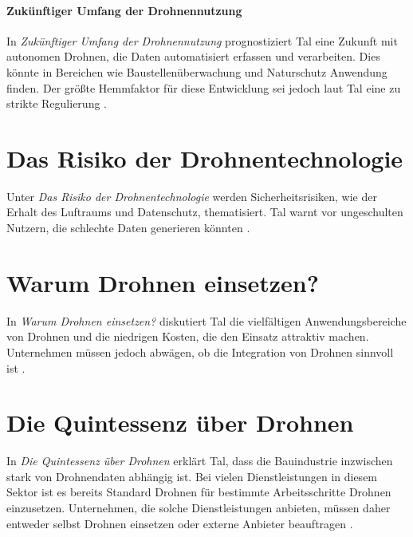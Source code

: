 \paragraph{Zukünftiger Umfang der Drohnennutzung}
In \textit{Zukünftiger Umfang der Drohnennutzung} prognostiziert Tal eine Zukunft mit autonomen Drohnen, die Daten automatisiert erfassen und verarbeiten.
Dies könnte in Bereichen wie Baustellenüberwachung und Naturschutz Anwendung finden.
Der größte Hemmfaktor für diese Entwicklung sei jedoch laut Tal eine zu strikte Regulierung \cite[S. 16]{Tal2021}.

\section{Das Risiko der Drohnentechnologie}
Unter \textit{Das Risiko der Drohnentechnologie} werden Sicherheitsrisiken, wie der Erhalt des Luftraums und Datenschutz, thematisiert.
Tal warnt vor ungeschulten Nutzern, die schlechte Daten generieren könnten \cite[S. 17-20]{Tal2021}.

\section{Warum Drohnen einsetzen?}
In \textit{Warum Drohnen einsetzen?} diskutiert Tal die vielfältigen Anwendungsbereiche von Drohnen und die niedrigen Kosten, die den Einsatz attraktiv machen. Unternehmen müssen jedoch abwägen, ob die Integration von Drohnen sinnvoll ist \cite[S. 21]{Tal2021}.

\section{Die Quintessenz über Drohnen}
In \textit{Die Quintessenz über Drohnen} erklärt Tal, dass die Bauindustrie inzwischen stark von Drohnendaten abhängig ist.
Bei vielen Dienstleistungen in diesem Sektor ist es bereits Standard Drohnen für bestimmte Arbeitsschritte Drohnen einzusetzen.
Unternehmen, die solche Dienstleistungen anbieten, müssen daher entweder selbst Drohnen einsetzen oder externe Anbieter beauftragen \cite[S. 22]{Tal2021}.

